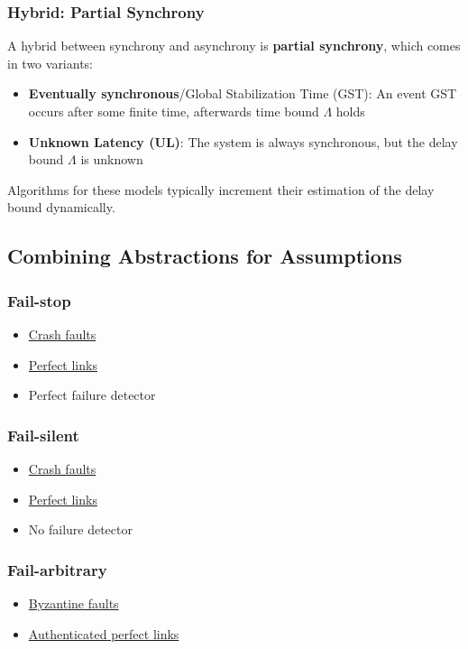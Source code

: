 \documentclass[12pt,A4]{extarticle}
\begin{document}
\subsubsection{Hybrid: Partial Synchrony}
A hybrid between synchrony and asynchrony is \textbf{partial synchrony}, which comes in two variants:
\begin{itemize}
  \item{\textbf{Eventually synchronous}/Global Stabilization Time (GST): An event GST occurs after some finite time, afterwards time bound $\Lambda$ holds}
  \item{\textbf{Unknown Latency (UL)}: The system is always synchronous, but the delay bound $\Lambda$ is unknown}
\end{itemize}
Algorithms for these models typically increment their estimation of the delay bound dynamically.

\subsection{Combining Abstractions for Assumptions}
\subsubsection{Fail-stop}
\begin{itemize}
  \item{\hyperref[sec:faultModel]{Crash faults}}
  \item{\hyperref[sec:perfectLinks]{Perfect links}}
  \item{Perfect failure detector}
\end{itemize}

\subsubsection{Fail-silent}
\begin{itemize}
  \item{\hyperref[sec:faultModel]{Crash faults}}
  \item{\hyperref[sec:perfectLinks]{Perfect links}}
  \item{No failure detector}
\end{itemize}

\subsubsection{Fail-arbitrary}
\begin{itemize}
  \item{\hyperref[sec:faultModel]{Byzantine faults}}
  \item{\hyperref[sec:perfectLinks]{Authenticated perfect links}}
\end{itemize}
\end{document}
